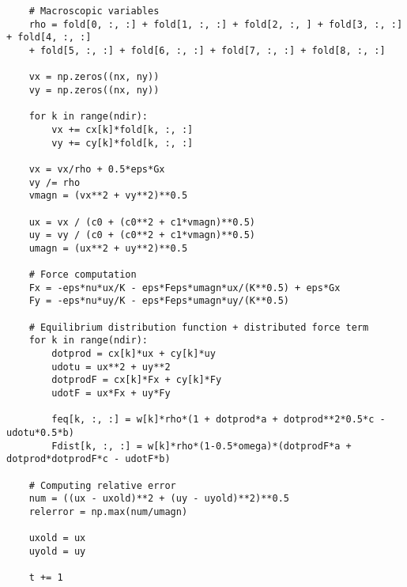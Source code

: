 \begin{mdframed}[backgroundcolor=red!10, linecolor=red!10]
\begin{verbatim}
    # Macroscopic variables
    rho = fold[0, :, :] + fold[1, :, :] + fold[2, :, ] + fold[3, :, :] + fold[4, :, :] 
    + fold[5, :, :] + fold[6, :, :] + fold[7, :, :] + fold[8, :, :]

    vx = np.zeros((nx, ny))
    vy = np.zeros((nx, ny))

    for k in range(ndir):
        vx += cx[k]*fold[k, :, :] 
        vy += cy[k]*fold[k, :, :] 

    vx = vx/rho + 0.5*eps*Gx 
    vy /= rho
    vmagn = (vx**2 + vy**2)**0.5

    ux = vx / (c0 + (c0**2 + c1*vmagn)**0.5)
    uy = vy / (c0 + (c0**2 + c1*vmagn)**0.5)
    umagn = (ux**2 + uy**2)**0.5

    # Force computation
    Fx = -eps*nu*ux/K - eps*Feps*umagn*ux/(K**0.5) + eps*Gx
    Fy = -eps*nu*uy/K - eps*Feps*umagn*uy/(K**0.5)

    # Equilibrium distribution function + distributed force term
    for k in range(ndir):
        dotprod = cx[k]*ux + cy[k]*uy
        udotu = ux**2 + uy**2
        dotprodF = cx[k]*Fx + cy[k]*Fy
        udotF = ux*Fx + uy*Fy
        
        feq[k, :, :] = w[k]*rho*(1 + dotprod*a + dotprod**2*0.5*c - udotu*0.5*b)
        Fdist[k, :, :] = w[k]*rho*(1-0.5*omega)*(dotprodF*a + dotprod*dotprodF*c - udotF*b) 

    # Computing relative error
    num = ((ux - uxold)**2 + (uy - uyold)**2)**0.5
    relerror = np.max(num/umagn)
    
    uxold = ux
    uyold = uy

    t += 1
\end{verbatim}
\end{mdframed}